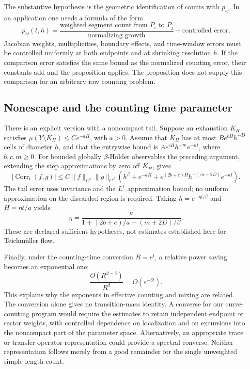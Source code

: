 \documentclass[11pt,a4paper]{article}
\numberwithin{equation}{section}
\theoremstyle{definition}
\theoremstyle{remark}
\begin{document}
The substantive hypothesis is the geometric identification of counts
with $p_{ij}$. In an application one needs a formula of the form
\[
 p_{ij}(t,h)=
 \frac{\text{weighted segment count from }P_i\text{ to }P_j}
      {\text{normalizing growth}}
 +\text{controlled error}.
\]
Jacobian weights, multiplicities, boundary effects, and time-window
errors must be controlled uniformly at both endpoints and at shrinking
resolution $h$. If the comparison error satisfies the same bound as
the normalized counting error, their constants add and the proposition
applies. The proposition does not supply this comparison for an
arbitrary raw counting problem.

\subsection{Nonescape and the counting time parameter}
\label{subsec:countmixnoncompact}

There is an explicit version with a noncompact tail. Suppose an
exhaustion $K_H$ satisfies
$\mu(Y\setminus K_H)\leq C e^{-aH}$, with $a>0$.
Assume that $K_H$ has at most $B e^{bH}h^{-D}$ cells of diameter
$h$, and that the entrywise bound is
$A e^{cH}h^{-m}e^{-\kappa t}$, where $b,c,m\geq0$.
For bounded globally $\beta$-H\"older observables the preceding
argument, extending the step approximations by zero off $K_H$, gives
\[
 |\operatorname{Corr}_t(f,g)|
 \leq C\|f\|_{C^\beta}\|g\|_{C^\beta}
 \left(h^\beta+e^{-aH}
       +e^{(2b+c)H}h^{-(m+2D)}e^{-\kappa t}\right).
\]
The tail error uses invariance and the $L^1$ approximation bound;
no uniform approximation on the discarded region is required.
Taking $h=e^{-\eta t/\beta}$ and $H=\eta t/a$ yields
\begin{equation}
 \boxed{\displaystyle
 \eta=
 \frac{\kappa}
 {1+(2b+c)/a+(m+2D)/\beta}.}
 \label{eq:countmixcusprate}
\end{equation}
These are declared sufficient hypotheses, not estimates established
here for Teichm\"uller flow.

Finally, under the counting-time conversion $R=e^t$, a relative power
saving becomes an exponential one:
\[
 \frac{O(R^{d-\delta})}{R^d}=O(e^{-\delta t}).
\]
This explains why the exponents in effective counting and mixing
are related. The conversion alone gives no transition-mass identity.
A converse for our curve-counting program would require the estimates
to retain independent endpoint or sector weights, with controlled
dependence on localization and on excursions into the noncompact
part of the parameter space. Alternatively, an appropriate trace or
transfer-operator representation could provide a spectral converse.
Neither representation follows merely from a good remainder for the
single unweighted simple-length count.
\end{document}
